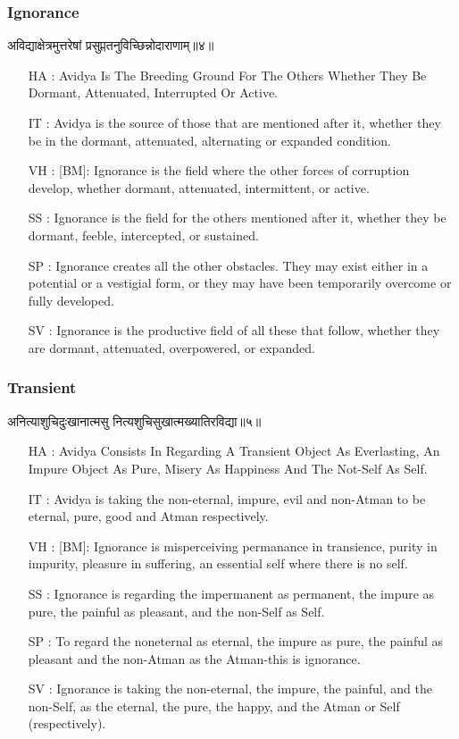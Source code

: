 \begin{frame}[fragile]\frametitle{Ignorance}
\begin{sanskrit}
अविद्याक्षेत्रमुत्तरेषां प्रसुप्ततनुविच्छिन्नोदाराणाम्॥४॥
\end{sanskrit}

	\begin{itemize}
	\item [HA]: Avidya Is The Breeding Ground For The Others Whether They Be Dormant, Attenuated, Interrupted Or Active.
	\item [IT]: Avidya is the source of those that are mentioned after it, whether they be in the dormant, attenuated, alternating or expanded condition.
	\item [VH]: [BM]: Ignorance is the field where the other forces of corruption develop, whether dormant, attenuated, intermittent, or active.
	\item [SS]: Ignorance is the field for the others mentioned after it, whether they be dormant, feeble, intercepted, or sustained.
	\item [SP]: Ignorance creates all the other obstacles. They may exist either in a potential or a vestigial form, or they may have been temporarily overcome or fully developed.
	\item [SV]: Ignorance is the productive field of all these that follow, whether they are dormant, attenuated, overpowered, or expanded. 
	\end{itemize}
\end{frame}


\begin{frame}[fragile]\frametitle{Transient}
\begin{sanskrit}
अनित्याशुचिदुःखानात्मसु नित्यशुचिसुखात्मख्यातिरविद्या॥५॥
\end{sanskrit}

	\begin{itemize}
	\item [HA]: Avidya Consists In Regarding A Transient Object As Everlasting, An Impure Object As Pure, Misery As Happiness And The Not-Self As Self.
	\item [IT]: Avidya is taking the non-eternal, impure, evil and non-Atman to be eternal, pure, good and Atman respectively.
	\item [VH]: [BM]: Ignorance is misperceiving permanance in transience, purity in impurity, pleasure in suffering, an essential self where there is no self.
	\item [SS]: Ignorance is regarding the impermanent as permanent, the impure as pure, the painful as pleasant, and the non-Self as Self.
	\item [SP]: To regard the noneternal as eternal, the impure as pure, the painful as pleasant and the non-Atman as the Atman-this is ignorance.
	\item [SV]: Ignorance is taking the non-eternal, the impure, the painful, and the non-Self, as the eternal, the pure, the happy, and the Atman or Self (respectively). 
	\end{itemize}
\end{frame}


